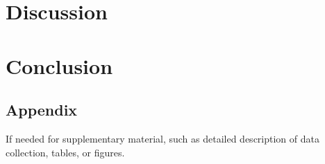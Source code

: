 \documentclass{micro-econ-thesis}
\begin{document}
\section{Discussion}

 

\section{Conclusion}


\cleardoublepage
{}
{} %
\printbibliography

\cleardoublepage
\begin{appendix}
\section{Appendix}
If needed for supplementary material, such as detailed description of data collection, tables, or figures.

\end{appendix}

\makeThesisDeclaration
\end{document}
